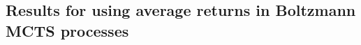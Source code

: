 \documentclass{article}
\newcommand{\bb}[1]{\mathbb{#1}}
\newcommand{\cl}[1]{\mathcal{#1}}
\newcommand{\reg}{\textnormal{reg}}
\theoremstyle{plain}
\newenvironment{proofoutline}{\proof[Proof outline]}{\endproof}
\begin{document}
\begin{appendices}
    \subsection{Results for using average returns in Boltzmann MCTS processes} \label{sec:ar_proofs}










\end{appendices}
\end{document}

